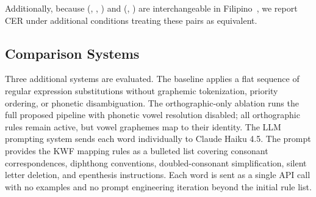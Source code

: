 Additionally, because (, , ) and (, )
are interchangeable in Filipino~\cite{schachter1972}, we report CER under
additional conditions treating these pairs as equivalent.

\subsection{Comparison Systems}

Three additional systems are evaluated. The baseline applies a flat sequence of
regular expression substitutions without graphemic tokenization, priority
ordering, or phonetic disambiguation. The orthographic-only ablation runs the
full proposed pipeline with phonetic vowel resolution disabled; all
orthographic rules remain active, but vowel graphemes map to their identity.
The LLM prompting system sends each word individually to Claude Haiku 4.5. The
prompt provides the KWF mapping rules as a bulleted list covering consonant
correspondences, diphthong conventions, doubled-consonant simplification,
silent letter deletion, and epenthesis instructions. Each word is sent as a
single API call with no examples and no prompt engineering iteration beyond the
initial rule list.